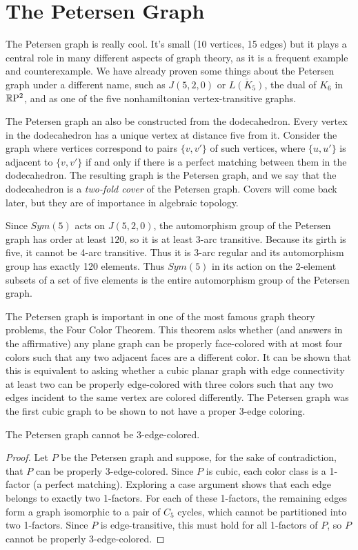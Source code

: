 \section*{The Petersen Graph}

The Petersen graph is really cool.  It's small (10 vertices, 15 edges) but it plays a central role in many different aspects of graph theory, as it is a frequent example and counterexample.  We have already proven some things about the Petersen graph under a different name, such as $J(5,2,0)$ or $\overline{L(K_5)}$, the dual of $K_6$ in $\mathbb{R}\mathrm{P}^2$, and as one of the five nonhamiltonian vertex-transitive graphs.

The Petersen graph an also be constructed from the dodecahedron.  Every vertex in the dodecahedron has a unique vertex at distance five from it. Consider the graph where vertices correspond to pairs $\{v,v'\}$ of such vertices, where $\{u,u'\}$ is adjacent to $\{v,v'\}$ if and only if there is a perfect matching between them in the dodecahedron.  The resulting graph is the Petersen graph, and we say that the dodecahedron is a \textit{two-fold cover} of the Petersen graph.  Covers will come back later, but they are of importance in algebraic topology.

Since $Sym(5)$ acts on $J(5,2,0)$, the automorphism group of the Petersen graph has order at least $120$, so it is at least 3-arc transitive.  Because its girth is five, it cannot be 4-arc transitive.  Thus it is 3-arc regular and its automorphism group has exactly 120 elements.  Thus $Sym(5)$ in its action on the 2-element subsets of a set of five elements is the entire automorphism group of the Petersen graph.

The Petersen graph is important in one of the most famous graph theory problems, the Four Color Theorem.  This theorem asks whether (and answers in the affirmative)  any plane graph can be properly face-colored with at most four colors such that any two adjacent faces are a different color.  It can be shown that this is equivalent to asking whether a cubic planar graph with edge connectivity at least two can be properly edge-colored with three colors such that any two edges incident to the same vertex are colored differently.  The Petersen graph was the first cubic graph to be shown to not have a proper 3-edge coloring.

\begin{theorem}
	The Petersen graph cannot be 3-edge-colored.
\end{theorem}
\begin{proof}
	Let $P$ be the Petersen graph and suppose, for the sake of contradiction, that $P$ can be properly 3-edge-colored.  Since $P$ is cubic, each color class is a 1-factor (a perfect matching).  Exploring a case argument shows that each edge belongs to exactly two 1-factors.  For each of these 1-factors, the remaining edges form a graph isomorphic to a pair of $C_5$ cycles, which cannot be partitioned into two 1-factors.  Since $P$ is edge-transitive, this must hold for all 1-factors of $P$, so $P$ cannot be properly 3-edge-colored.
\end{proof}

